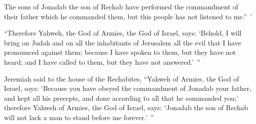 {The sons of Jonadab the son of Rechab have performed the commandment of their father which he commanded them, but this people has not listened to me.” ’
\par }{\PP {}“Therefore Yahweh, the God of Armies, the God of Israel, says: ‘Behold, I will bring on Judah and on all the inhabitants of Jerusalem all the evil that I have pronounced against them; because I have spoken to them, but they have not heard; and I have called to them, but they have not answered.’ ”
\par }{\PP {}Jeremiah said to the house of the Rechabites, “Yahweh of Armies, the God of Israel, says: ‘Because you have obeyed the commandment of Jonadab your father, and kept all his precepts, and done according to all that he commanded you;’
therefore Yahweh of Armies, the God of Israel, says: ‘Jonadab the son of Rechab will not lack a man to stand before me forever.’ ”

}
